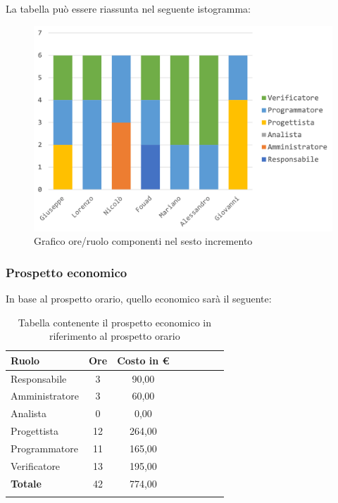 		La tabella può essere riassunta nel seguente istogramma:
		\begin{figure}[H]
			\centering
			\includegraphics[width=0.8\linewidth]{./images/preventivo/incremento6-1.png}
			\caption{Grafico ore/ruolo componenti nel sesto incremento}
			\label{fig:grafico suddivione ruoli incremento VI}
		\end{figure}
		
		\subsubsection{Prospetto economico}
		In base al prospetto orario, quello economico sarà il seguente: 
		
		\begin{longtable}{|l|c|c|c|c|c|c|c|}
			\hline
			\rowcolor{lighter-grayer}
			\textbf{Ruolo} & \textbf{Ore} & \textbf{Costo in € } \\
			\hline
			\endfirsthead
			
			\hline
			Responsabile 	    & 3 & 90,00\\
			\hline 
			\hline
			Amministratore	   & 3 & 60,00\\
			\hline
			\hline
			Analista 				& 0 & 0,00\\
			\hline
			\hline
			Progettista 		   & 12 & 264,00\\
			\hline
			\hline
			Programmatore 	  & 11 & 165,00\\
			\hline
			\hline
			Verificatore 		   & 13 & 195,00\\
			\hline
			\textbf{Totale} 	 & 42 & 774,00\\
			\hline
			\caption{Tabella contenente il prospetto economico in riferimento al prospetto orario}
		\end{longtable}
		\pagebreak
		
